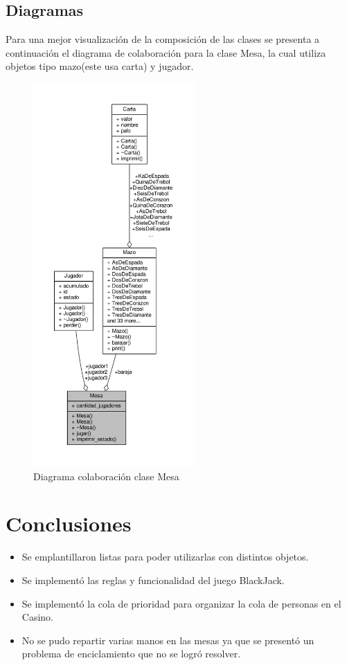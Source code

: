 \documentclass[11pt]{article}
\begin{document}
\newpage
\subsection{Diagramas}
Para una mejor visualización de la composición de las clases se presenta a continuación el diagrama de colaboración para la clase Mesa, la cual utiliza objetos tipo mazo(este usa carta) y jugador.

\begin{figure}[htbp]
\centering
\includegraphics[width=0.55\textwidth]{img/class_mesa__coll__graph.pdf}
\caption{\label{fig:umlcalc} Diagrama colaboración clase Mesa}
\end{figure}



 
\newpage
\section{Conclusiones}
\begin{itemize}
\item Se emplantillaron listas para poder utilizarlas con distintos objetos.
\item Se implementó las reglas y funcionalidad del juego BlackJack.
\item Se implementó la cola de prioridad para organizar la cola de personas en el Casino.
\item No se pudo repartir varias manos en las mesas ya que se presentó un problema de enciclamiento que no se logró resolver.
\end{itemize}
\newpage
 
\end{document}
